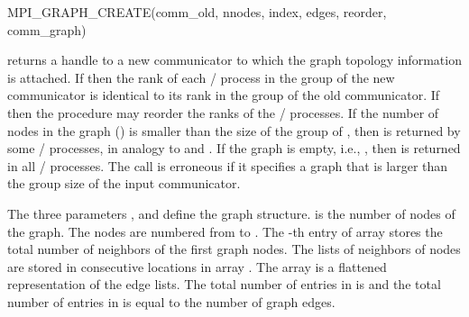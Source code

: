 \begin{funcdef}{MPI\_GRAPH\_CREATE}{(\mbox{comm\_old}, \mbox{nnodes}, \mbox{index}, \mbox{edges}, \mbox{reorder}, \mbox{comm\_graph})}
\end{funcdef}

 returns a handle to a new communicator to which the
graph topology information is attached.  If  then the
rank of each \MPI/ process in the group of the new communicator is identical to its rank in the
group of the old communicator.  If  then the procedure may 
reorder the ranks of the \MPI/ processes.  If the number of nodes in the graph
() is smaller than the size of the group of
, then  is returned by some \MPI/ processes, in
analogy to  and .
If the graph is empty, i.e., ,
then  is returned in all \MPI/ processes. 
The call
is erroneous if it specifies a graph that is larger than the group size of the
input communicator.

The three parameters ,  and  define the graph
structure.
 is the number of nodes of the graph.   The nodes are numbered
from  to .
The 
-th 
entry of array  stores the total number of
neighbors of the first  graph nodes.   The lists of neighbors of
nodes  are stored in consecutive locations in array
.  The array  is a flattened representation
of the edge lists.
The total number of entries in  is  and
the total number of entries in  is equal to the number of
graph edges.

